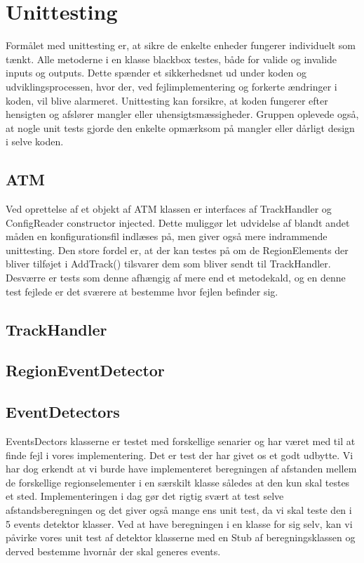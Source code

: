 \section{Unittesting}
Formålet med unittesting er, at sikre de enkelte enheder fungerer individuelt som tænkt. Alle metoderne i en klasse blackbox testes, både for valide og invalide inputs og outputs. Dette spænder et sikkerhedsnet ud under koden og udviklingsprocessen, hvor der, ved fejlimplementering og forkerte ændringer i koden, vil blive alarmeret. Unittesting kan forsikre, at koden fungerer efter hensigten og afslører mangler eller uhensigtsmæssigheder. Gruppen oplevede også, at nogle unit tests gjorde den enkelte opmærksom på mangler eller dårligt design i selve koden.

\subsection{ATM}
Ved oprettelse af et objekt af ATM klassen er interfaces af TrackHandler og ConfigReader constructor injected. Dette muliggør let udvidelse af blandt andet måden en konfigurationsfil indlæses på, men giver også mere indrammende unittesting. Den store fordel er, at der kan testes på om de RegionElements der bliver tilføjet i AddTrack() tilsvarer dem som bliver sendt til TrackHandler. Desværre er tests som denne afhængig af mere end et metodekald, og en denne test fejlede er det sværere at bestemme hvor fejlen befinder sig.

\subsection{TrackHandler}

\subsection{RegionEventDetector}
\subsection{EventDetectors}
EventsDectors klasserne er testet med forskellige senarier og har været med til at finde fejl i vores implementering. Det er test der har givet os et godt udbytte. Vi har dog erkendt at vi burde have implementeret beregningen af afstanden mellem de forskellige regionselementer i en særskilt klasse således at den kun skal testes et sted. Implementeringen i dag gør det rigtig svært at test selve afstandsberegningen og det giver også mange ens unit test, da vi skal teste den i 5 events detektor klasser. Ved at have beregningen i en klasse for sig selv, kan vi påvirke vores unit test af detektor klasserne med en Stub af beregningsklassen og derved bestemme hvornår der skal generes events.

